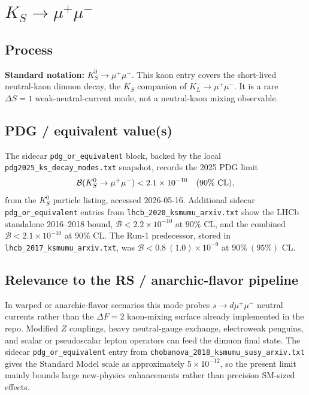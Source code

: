 
\section{\(K_S \to \mu^+\mu^-\)}

\subsection*{Process}
\textbf{Standard notation:} \(K_S^0\to\mu^+\mu^-\).  This kaon entry covers the
short-lived neutral-kaon dimuon decay, the \(K_S\) companion of
\(K_L\to\mu^+\mu^-\).  It is a rare \(\Delta S=1\)
weak-neutral-current mode, not a neutral-kaon mixing observable.

\subsection*{PDG / equivalent value(s)}
The sidecar \texttt{pdg\_or\_equivalent} block, backed by the local
\texttt{pdg2025\_ks\_decay\_modes.txt} snapshot, records the 2025 PDG limit
\[
  \mathcal{B}(K_S^0\to\mu^+\mu^-) < 2.1\times 10^{-10}
  \quad (90\%~{\rm CL}),
\]
from the \(K_S^0\) particle listing, accessed 2026-05-16.  Additional
sidecar \texttt{pdg\_or\_equivalent} entries from
\texttt{lhcb\_2020\_ksmumu\_arxiv.txt} show the LHCb
standalone 2016--2018 bound,
\(\mathcal{B}<2.2\times10^{-10}\) at \(90\%\) CL, and the combined
\(\mathcal{B}<2.1\times10^{-10}\) at \(90\%\) CL.  The Run-1 predecessor,
stored in \texttt{lhcb\_2017\_ksmumu\_arxiv.txt}, was
\(\mathcal{B}<0.8~(1.0)\times10^{-9}\) at \(90\%~(95\%)\) CL.

\subsection*{Relevance to the RS / anarchic-flavor pipeline}
In warped or anarchic-flavor scenarios this mode probes \(s\to d\mu^+\mu^-\)
neutral currents rather than the \(\Delta F=2\) kaon-mixing surface already
implemented in the repo.  Modified \(Z\) couplings, heavy neutral-gauge
exchange, electroweak penguins, and scalar or pseudoscalar lepton operators can
feed the dimuon final state.  The sidecar \texttt{pdg\_or\_equivalent} entry
from \texttt{chobanova\_2018\_ksmumu\_susy\_arxiv.txt} gives the Standard
Model scale as approximately \(5\times10^{-12}\), so the present limit mainly
bounds large new-physics enhancements rather than precision SM-sized effects.

